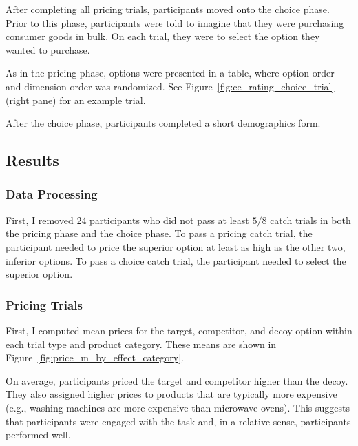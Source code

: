 After completing all pricing trials, participants moved onto the choice phase. Prior to this phase, participants were told to imagine that they were purchasing consumer goods in bulk. On each trial, they were to select the option they wanted to purchase. 

As in the pricing phase, options were presented in a table, where option order and dimension order was randomized. See Figure~\ref{fig:ce_rating_choice_trial} (right pane) for an example trial.

After the choice phase, participants completed a short demographics form.

\subsection{Results}

\subsubsection{Data Processing}

First, I removed 24 participants who did not pass at least $5/8$ catch trials in both the pricing phase and the choice phase. To pass a pricing catch trial, the participant needed to price the superior option at least as high as the other two, inferior options. To pass a choice catch trial, the participant needed to select the superior option. 

\subsubsection{Pricing Trials}

First, I computed mean prices for the target, competitor, and decoy option within each trial type and product category. These means are shown in Figure~\ref{fig:price_m_by_effect_category}.

On average, participants priced the target and competitor higher than the decoy. They also assigned higher prices to products that are typically more expensive (e.g., washing machines are more expensive than microwave ovens). This suggests that participants were engaged with the task and, in a relative sense, participants performed well.

